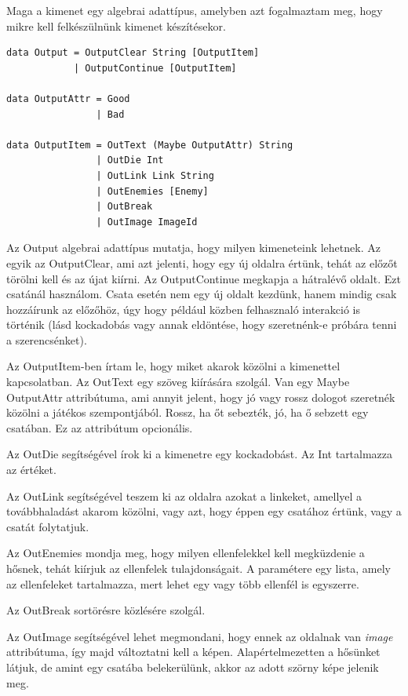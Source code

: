 \documentclass[12pt,a4paper,oneside]{report}
\newcommand{\dt}[1]{{\color{State}#1}}
\newcommand{\attr}{\emph}
\begin{document}
      Maga a kimenet egy algebrai adattípus, amelyben azt fogalmaztam
      meg, hogy mikre kell felkészülnünk kimenet készítésekor.
      \begin{verbatim}
data Output = OutputClear String [OutputItem]
            | OutputContinue [OutputItem]

data OutputAttr = Good
                | Bad

data OutputItem = OutText (Maybe OutputAttr) String
                | OutDie Int
                | OutLink Link String
                | OutEnemies [Enemy]
                | OutBreak
                | OutImage ImageId

      \end{verbatim}
      Az \dt{Output} algebrai adattípus mutatja, hogy milyen kimeneteink
      lehetnek. Az egyik az \dt{OutputClear}, ami azt jelenti, hogy egy új
      oldalra értünk, tehát az előzőt törölni kell és az újat
      kiírni. Az \dt{OutputContinue} megkapja a hátralévő oldalt. Ezt
      csatánál használom. Csata esetén nem egy új oldalt kezdünk,
      hanem mindig csak hozzáírunk az előzőhöz, úgy hogy például közben
      felhasznaló interakció is történik (lásd kockadobás vagy annak
      eldöntése, hogy szeretnénk-e próbára tenni a szerencsénket).
      
      Az \dt{OutputItem}-ben írtam le, hogy miket akarok közölni a
      kimenettel kapcsolatban. Az \dt{OutText} egy szöveg kiírására
      szolgál. Van egy Maybe \dt{OutputAttr} attribútuma, ami annyit
      jelent, hogy jó vagy rossz dologot szeretnék közölni a játékos
      szempontjából. Rossz, ha őt sebezték, jó, ha ő sebzett egy
      csatában. Ez az attribútum opcionális.

      Az \dt{OutDie} segítségével írok ki a kimenetre egy kockadobást. Az
      Int tartalmazza az értéket.

      Az \dt{OutLink} segítségével teszem ki az oldalra azokat a linkeket,
      amellyel a továbbhaladást akarom közölni, vagy azt, hogy éppen
      egy csatához értünk, vagy a csatát folytatjuk.

      Az \dt{OutEnemies} mondja meg, hogy milyen ellenfelekkel kell
      megküzdenie a hősnek, tehát kiírjuk az ellenfelek
      tulajdonságait. A paramétere egy lista, amely az ellenfeleket
      tartalmazza, mert lehet egy vagy több ellenfél is egyszerre.

      Az \dt{OutBreak} sortörésre közlésére szolgál.

      Az \dt{OutImage} segítségével lehet megmondani, hogy ennek az
      oldalnak van \attr{image} attribútuma, így majd változtatni kell a
      képen. Alapértelmezetten a hősünket látjuk, de amint egy csatába
      belekerülünk, akkor az adott szörny képe jelenik meg.
\end{document}
